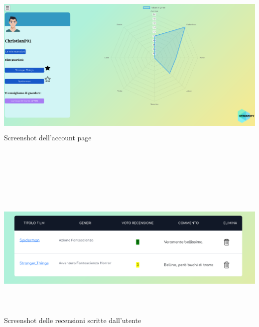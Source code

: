 \documentclass[12pt]{article}
\begin{document}
\begin{center}
		\centering \includegraphics[width=15cm, height=7cm]{Immagini/Account_screen.png} \\
		\centering Screenshot dell'account page ~\\ ~\\ ~\\ ~\\ ~\\
		
		\centering \includegraphics[width=15cm, height=7cm]{Immagini/User_reviews_screen.png} \\
		\centering Screenshot delle recensioni scritte dall'utente
	\end{center}
	\pagebreak
	
	
	
\end{document}

